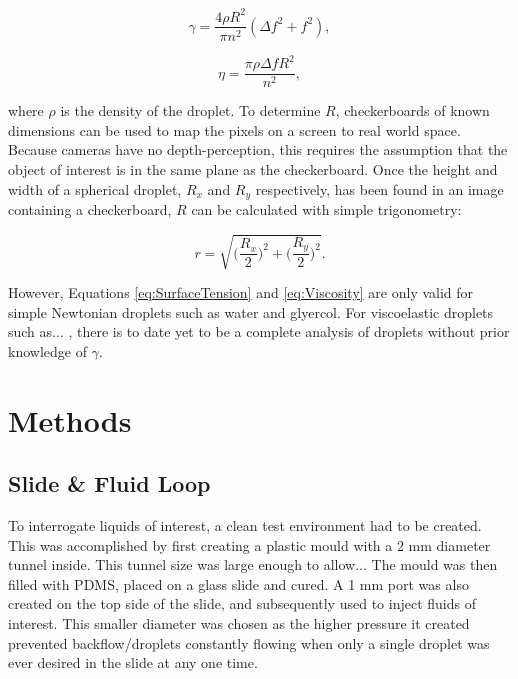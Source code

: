 \documentclass{physics_article_B}
\begin{document}
    \begin{equation} 
    \label{eq:SurfaceTension}
    \gamma = \frac{4\rho R^{2}}{\pi n^{2}}(\Delta f^{2} + f^{2}),
    \end{equation}
    
    \begin{equation} 
    \label{eq:Viscosity}
    \eta = \frac{\pi \rho \Delta f R^{2}}{n^{2}},
    \end{equation}

    where $\rho$ is the density of the droplet. To determine $R$, checkerboards of known dimensions can be used to map the pixels on a screen to real world space. Because cameras have no depth-perception, this requires the assumption that the object of interest is in the same plane as the checkerboard. Once the height and width of a spherical droplet, $R_x$ and $R_y$ respectively, has been found in an image containing a checkerboard, $R$ can be calculated with simple trigonometry:
            
            \begin{equation}\label{eq:radii}
                r = \sqrt{\Big(\frac{R_x}{2}\Big)^2 + \Big(\frac{R_y}{2}\Big)^2} .
            \end{equation}
    
    However, Equations \ref{eq:SurfaceTension} and \ref{eq:Viscosity} are only valid for simple Newtonian droplets such as water and glyercol. For viscoelastic droplets such as... , there is to date yet to be a complete analysis of droplets without prior knowledge of $\gamma$.
\section{Methods\label{sect:method}}

    \subsection{Slide \& Fluid Loop\label{sect:method:slide}}
    
        To interrogate liquids of interest, a clean test environment had to be created. This was accomplished by first creating a plastic mould with a 2 mm diameter tunnel inside. This tunnel size was large enough to allow...  The mould was then filled with PDMS, placed on a glass slide and cured. A 1 mm port was also created on the top side of the slide, and subsequently used to inject fluids of interest. This smaller diameter was chosen as the higher pressure it created prevented backflow/droplets constantly flowing when only a single droplet was ever desired in the slide at any one time.
        
\end{document}
